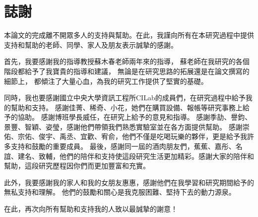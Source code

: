 \documentclass[class=NCU_thesis, crop=false]{standalone}
\begin{document}
\chapter{誌謝}

本論文的完成離不開眾多人的支持與幫助。在此，我謹向所有在本研究過程中提供支持和幫助的老師、同學、家人及朋友表示誠摯的感謝。

首先，我要感謝我的指導教授蘇木春老師兩年來的指導，
蘇老師在我研究的各個階段都給予了我寶貴的指導和建議，
無論是在研究思路的拓展還是在論文撰寫的細節上，
都傾注了大量心血，為我的研究工作提供了堅實的基礎。

同時，我也要感謝國立中央大學資訊工程所CILab的成員們，在研究過程中給予我的幫助和支持。
感謝佳菁、稀奇、小花，她們在購買設備、報帳等研究事務上給予的協助。
感謝博班學長威任，在研究上給予的意見和指導。
感謝季劼、譽鈞、景豐、智穎、姿瑩，感謝他們帶領我們熟悉實驗室並在各方面提供幫助。
感謝崇佑、宗佑、俊宇、禹丞、宜歡、宥俞，他們不僅是吃喝玩樂的夥伴，更是給予我許多支持和鼓勵的重要成員。
最後，感謝同一屆的酒肉朋友們，蕉蕉、嘉彤、名誼、建名、致輔，他們的陪伴和支持使這段研究生活更加精彩。感謝大家的陪伴和幫助，這段研究歷程因你們而更加豐富和充實。

此外，我要感謝我的家人和我的女朋友惠惠，感謝他們在我學習和研究期間給予的無私支持和理解。
他們的鼓勵和關心是我克服困難、堅持下去的動力源泉。

在此，再次向所有幫助和支持我的人致以最誠摯的謝意！
\end{document}
